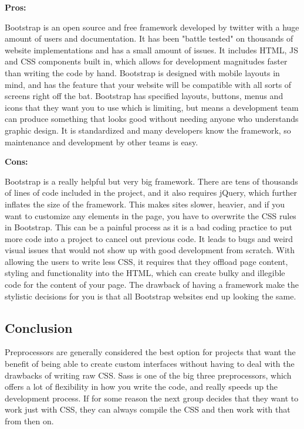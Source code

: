 \documentclass[draftclsnofoot,onecolumn,letterpaper,10pt,compsoc]{IEEEtran}
\begin{document}
    \noindent \textbf{Pros:}

    Bootstrap is an open source and free framework developed by twitter with a huge amount of users and documentation.\cite{bootstrap}
    It has been "battle tested" on thousands of website implementations and has a small amount of issues.
    It includes HTML, JS and CSS components built in, which allows for development magnitudes faster than writing the code by hand.
    Bootstrap is designed with mobile layouts in mind, and has the feature that your website will be compatible with all sorts of screens right off the bat.
    Bootstrap has specified layouts, buttons, menus and icons that they want you to use which is limiting, but means a development team can produce something that looks good without needing anyone who understands graphic design.
    It is standardized and many developers know the framework, so maintenance and development by other teams is easy.

    \noindent \textbf{Cons:}

    Bootstrap is a really helpful but very big framework.
    There are tens of thousands of lines of code included in the project, and it also requires jQuery, which further inflates the size of the framework.
    This makes sites slower, heavier, and if you want to customize any elements in the page, you have to overwrite the CSS rules in Bootstrap.\cite{BootstrapProCon}
    This can be a painful process as it is a bad coding practice to put more code into a project to cancel out previous code.
    It leads to bugs and weird visual issues that would not show up with good development from scratch.
    With allowing the users to write less CSS, it requires that they offload page content, styling and functionality into the HTML, which can create bulky and illegible code for the content of your page.
    The drawback of having a framework make the stylistic decisions for you is that all Bootstrap websites end up looking the same.

  \subsection{Conclusion}
  Preprocessors are generally considered the best option for projects that want the benefit of being able to create custom interfaces without having to deal with the drawbacks of writing raw CSS.
  Sass is one of the big three preprocessors, which offers a lot of flexibility in how you write the code, and really speeds up the development process.
  If for some reason the next group decides that they want to work just with CSS, they can always compile the CSS and then work with that from then on.
\end{document}
